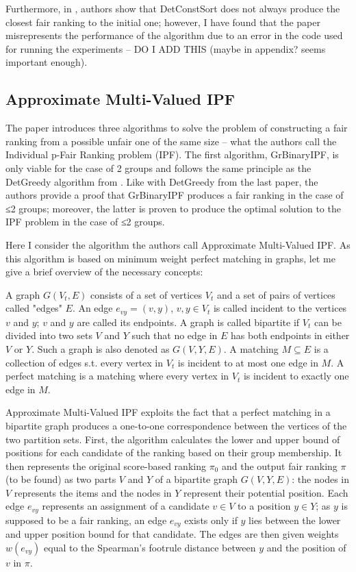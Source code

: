 Furthermore, in \cite{RAPF}, authors show that DetConstSort does not always produce the closest fair ranking to the initial one; however, I have found that the paper misrepresents the performance of the algorithm due to an error in the code used for running the experiments -- DO I ADD THIS (maybe in appendix? seems important enough).


\subsection{Approximate Multi-Valued IPF}\label{subsect:amvipf}

The paper \cite{RAPF} introduces three algorithms to solve the problem of constructing a fair ranking from a possible unfair one of the same size – what the authors call the Individual p-Fair Ranking problem (IPF). The first algorithm, GrBinaryIPF, is only viable for the case of 2 groups and follows the same principle as the DetGreedy algorithm from \cite{linkedin}. Like with DetGreedy from the last paper, the authors provide a proof that GrBinaryIPF produces a fair ranking in the case of ≤2 groups; moreover, the latter is proven to produce the optimal solution to the IPF problem in the case of ≤2 groups.

Here I consider the algorithm the authors call Approximate Multi-Valued IPF. As this algorithm is based on minimum weight perfect matching in graphs, let me give a brief overview of the necessary concepts:

A graph $G(V_t,E)$ consists of a set of vertices $V_t$ and a set of pairs of vertices called "edges" $E$. An edge $e_{vy} = (v,y)$, $v,y \in V_t$ is called incident to the vertices $v$ and $y$; $v$ and $y$ are called its endpoints. A graph is called bipartite if $V_t$ can be divided into two sets $V$ and $Y$ such that no edge in $E$ has both endpoints in either $V$ or $Y$. Such a graph is also denoted as $G(V,Y,E)$. A matching $M \subseteq E$ is a collection of edges s.t. every vertex in $V_t$ is incident to at most one edge in $M$. A perfect matching is a matching where every vertex in $V_t$ is incident to exactly one edge in $M$.

Approximate Multi-Valued IPF exploits the fact that a perfect matching in a bipartite graph produces a one-to-one correspondence between the vertices of the two partition sets. First, the algorithm calculates the lower and upper bound of positions for each candidate of the ranking based on their group membership. It then represents the original score-based ranking $\pi_0$ and the output fair ranking $\pi$ (to be found) as two parts $V$ and $Y$ of a bipartite graph $G(V,Y,E)$: the nodes in $V$ represents the items and the nodes in $Y$ represent their potential position. Each edge $e_{vy}$ represents an assignment of a candidate $v \in V$ to a position $y \in Y$; as $y$ is supposed to be a fair ranking, an edge $e_{vy}$ exists only if $y$ lies between the lower and upper position bound for that candidate. The edges are then given weights $w(e_{vy})$ equal to the Spearman's footrule distance between $y$ and the position of $v$ in $\pi$.

